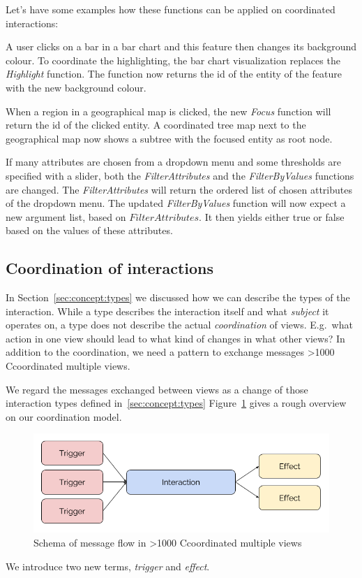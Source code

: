 \documentclass{article}
\newcommand\hmm[1]{\ifnum\ifhmode\spacefactor\else2000\fi>1000 \uppercase{#1}\else#1\fi}
\newcommand{\cmvs}{\hmm{c}oordinated multiple views}
\begin{document}
Let's have some examples how these functions can be applied on coordinated interactions:

A user clicks on a bar in a bar chart and this feature then changes its background colour.
To coordinate the highlighting, the bar chart visualization replaces the \emph{Highlight} function.
The function now returns the id of the entity of the feature with the new background colour.

When a region in a geographical map is clicked, the new \emph{Focus} function will return the id of the clicked entity.
A coordinated tree map next to the geographical map now shows a subtree with the focused entity as root node.

If many attributes are chosen from a dropdown menu and some thresholds are specified with a slider, both the \emph{FilterAttributes} and the \emph{FilterByValues} functions are changed.
The \emph{FilterAttributes} will return the ordered list of chosen attributes of the dropdown menu.
The updated \emph{FilterByValues} function will now expect a new argument list, based on $ FilterAttributes $.
It then yields either true or false based on the values of these attributes.

\subsection{Coordination of interactions}

In Section~\ref{sec:concept:types} we discussed how we can describe the types of the interaction.
While a type describes the interaction itself and what \emph{subject} it operates on, a type does not describe the actual \emph{coordination} of views.
E.g.\ what action in one view should lead to what kind of changes in what other views?
In addition to the coordination, we need a pattern to exchange messages \cmvs{}.

We regard the messages exchanged between views as a change of those interaction types defined in~\ref{sec:concept:types}
Figure~\ref{fig:concept:trigger-effect} gives a rough overview on our coordination model.
\begin{figure}[h!]
  \centering
  \includegraphics[width=\textwidth]{images/trigger-effect.png}
  \caption{Schema of message flow in \cmvs{}}\label{fig:concept:trigger-effect}
\end{figure}
We introduce two new terms, \emph{trigger} and \emph{effect}.
\end{document}
